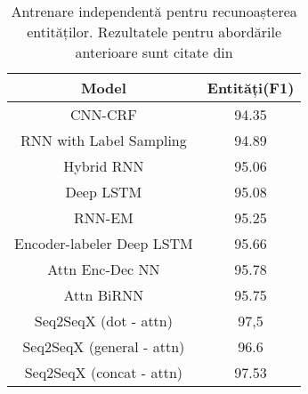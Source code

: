 \bigskip
\begin{table}[htp]
	\small
	\centering
	\begin{tabular}{ c c } 
		\hline
		\textbf{Model}	& \textbf{Entități(F1)} \\
		\hline
		CNN-CRF \cite{sarika-cnn-crf} & 94.35 \\
		RNN with Label Sampling \cite{rnn-label-samp} & 94.89 \\
		Hybrid RNN \cite{mesnil-rnn-crf} & 95.06 \\
		Deep LSTM \cite{deep-lstm} & 95.08 \\
		RNN-EM \cite{rnn-em} & 95.25 \\
		Encoder-labeler Deep LSTM \cite{ecn-deep-lstm} & 95.66 \\
		Attn Enc-Dec NN \cite{att_joint_bing} & 95.78 \\
		Attn BiRNN \cite{att_joint_bing} & 95.75 \\
		\hline
		Seq2SeqX (dot - attn) & 97,5 \\
		Seq2SeqX (general - attn) & 96.6 \\
		Seq2SeqX (concat - attn) & 97.53 \\
		\hline
	\end{tabular}
	\caption{Antrenare independentă pentru recunoașterea entităților. Rezultatele pentru abordările anterioare sunt citate din \cite{att_joint_bing}}
	\label{rezultate2}
\end{table}


